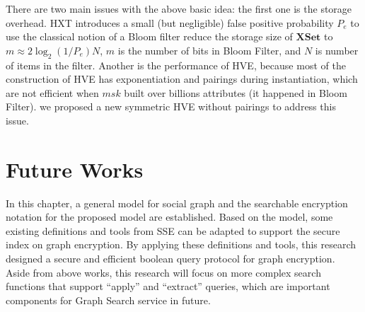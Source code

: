There are two main issues with the above basic idea: the first one is the storage overhead. HXT introduces a small (but negligible) false positive probability $P_e$ to use the classical notion of a Bloom filter \cite{bloom1970space} reduce the storage size of $\mathbf{XSet}$ to $m \approx 2\log_2(1/P_e)N$, $m$ is the number of bits in Bloom Filter, and $N$ is number of items in the filter. Another is the performance of HVE, because most of the construction of HVE has exponentiation and pairings during instantiation, which are not efficient when $msk$ built over billions attributes (it happened in Bloom Filter). we proposed a new symmetric HVE without pairings to address this issue.

\section{Future Works}
In this chapter, a general model for social graph and the searchable encryption notation for the proposed model are established. Based on the model, some existing definitions and tools from SSE can be adapted to support the secure index on graph encryption. By applying these definitions and tools, this research designed a secure and efficient boolean query protocol for graph encryption. Aside from above works, this research will focus on more complex search functions that support ``apply'' and ``extract'' queries, which are important components for Graph Search service in future.



